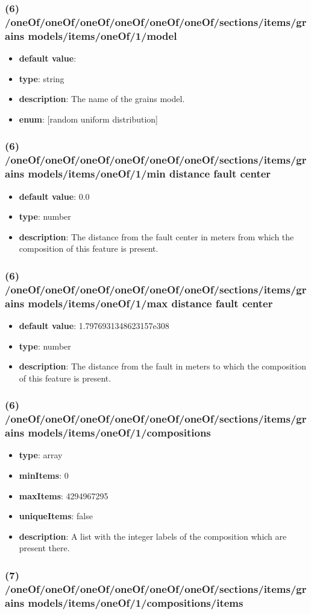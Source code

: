 \subsubsection{(6) /oneOf/oneOf/oneOf/oneOf/oneOf/oneOf/sections/items/grains models/items/oneOf/1/model}
\begin{itemize}[leftmargin=6em]\item {\bf default value}: 
\item {\bf type}: string
\item {\bf description}: The name of the grains model.
\item {\bf enum}: [random uniform distribution]\end{itemize}\subsubsection{(6) /oneOf/oneOf/oneOf/oneOf/oneOf/oneOf/sections/items/grains models/items/oneOf/1/min distance fault center}
\begin{itemize}[leftmargin=6em]\item {\bf default value}: 0.0
\item {\bf type}: number
\item {\bf description}: The distance from the fault center in meters from which the composition of this feature is present.
\end{itemize}\subsubsection{(6) /oneOf/oneOf/oneOf/oneOf/oneOf/oneOf/sections/items/grains models/items/oneOf/1/max distance fault center}
\begin{itemize}[leftmargin=6em]\item {\bf default value}: 1.7976931348623157e308
\item {\bf type}: number
\item {\bf description}: The distance from the fault in meters to which the composition of this feature is present.
\end{itemize}\subsubsection{(6) /oneOf/oneOf/oneOf/oneOf/oneOf/oneOf/sections/items/grains models/items/oneOf/1/compositions}
\begin{itemize}[leftmargin=6em]\item {\bf type}: array
\item {\bf minItems}: 0
\item {\bf maxItems}: 4294967295
\item {\bf uniqueItems}: false
\item {\bf description}: A list with the integer labels of the composition which are present there.
\end{itemize}\subsubsection{(7) /oneOf/oneOf/oneOf/oneOf/oneOf/oneOf/sections/items/grains models/items/oneOf/1/compositions/items}
